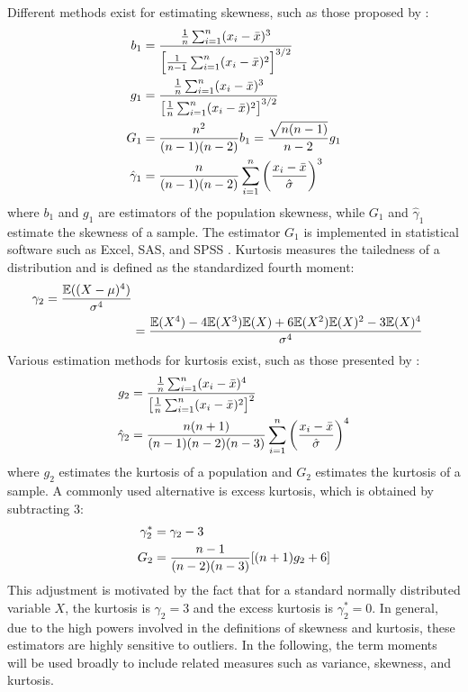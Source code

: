 Different methods exist for estimating skewness, such as those proposed by \cite{joanesComparingMeasuresSample1998}:
\begin{align}
    b_1 &= \frac{\frac{1}{n}\sum_{i=1}^{n}(x_i-\bar{x})^3}{\left[\frac{1}{n-1}\sum_{i=1}^{n}(x_i-\bar{x})^2\right]^{3/2}} \notag \\
    g_1 &= \frac{\frac{1}{n}\sum_{i=1}^{n}(x_i-\bar{x})^3}{\left[\frac{1}{n}\sum_{i=1}^{n}(x_i-\bar{x})^2\right]^{3/2}} \notag \\
    G_1 &= \frac{n^2}{(n-1)(n-2)}b_1 = \frac{\sqrt{n(n-1)}}{n-2}g_1 \notag \\
    \hat{\gamma}_1 &= \frac{n}{(n-1)(n-2)}\sum_{i=1}^n \left(\frac{x_i-\bar{x}}{\hat{\sigma}}\right)^3 \notag
\end{align}
where $b_1$ and $g_1$ are estimators of the population skewness, while $G_1$ and $\hat{\gamma}_1$ estimate the skewness of a sample. The estimator $G_1$ is implemented in statistical software such as Excel, SAS, and SPSS \cite{doaneMeasuringSkewnessForgotten2011}. Kurtosis measures the tailedness of a distribution and is defined as the standardized fourth moment:
\begin{align}
    \label{eq:definition_kurtosis}
    \gamma_2 = \frac{\mathbb{E}((X-\mu)^4)}{\sigma^4} \\
    &= \frac{\mathbb{E}(X^4) - 4\mathbb{E}(X^3)\mathbb{E}(X) + 6\mathbb{E}(X^2)\mathbb{E}(X)^2 - 3\mathbb{E}(X)^4}{\sigma^4} \notag
\end{align}
Various estimation methods for kurtosis exist, such as those presented by \cite{joanesComparingMeasuresSample1998}:
\begin{align}
    g_2 &= \frac{\frac{1}{n}\sum_{i=1}^{n}(x_i-\bar{x})^4}{\left[\frac{1}{n}\sum_{i=1}^{n}(x_i-\bar{x})^2\right]^2} \notag \\
    \hat{\gamma}_2 &= \frac{n(n+1)}{(n-1)(n-2)(n-3)}\sum_{i=1}^n \left(\frac{x_i-\bar{x}}{\hat{\sigma}}\right)^4 \notag
\end{align}
where $g_2$ estimates the kurtosis of a population and $G_2$ estimates the kurtosis of a sample. A commonly used alternative is excess kurtosis, which is obtained by subtracting 3:
\begin{align}
    \gamma_2^* &= \gamma_2 - 3\notag \\
    G_2 &= \frac{n-1}{(n-2)(n-3)}[(n+1)g_2 + 6] \notag
\end{align}
This adjustment is motivated by the fact that for a standard normally distributed variable $X$, the kurtosis is $\gamma_2 = 3$ and the excess kurtosis is $\gamma_2^* = 0$. In general, due to the high powers involved in the definitions of skewness and kurtosis, these estimators are highly sensitive to outliers. In the following, the term moments will be used broadly to include related measures such as variance, skewness, and kurtosis.

